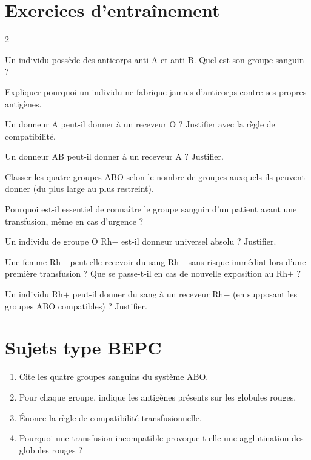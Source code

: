 \section{Exercices d'entraînement}
\begin{multicols}{2}

\exo{} Un individu possède des anticorps anti-A et anti-B. Quel est son groupe
sanguin ?

\exo{} Expliquer pourquoi un individu ne fabrique jamais d'anticorps contre ses
propres antigènes.

\exo{} Un donneur A peut-il donner à un receveur O ? Justifier avec la règle de
compatibilité.

\exo{} Un donneur AB peut-il donner à un receveur A ? Justifier.

\exo{} Classer les quatre groupes ABO selon le nombre de groupes auxquels ils
peuvent donner (du plus large au plus restreint).

\exo{} Pourquoi est-il essentiel de connaître le groupe sanguin d'un patient
avant une transfusion, même en cas d'urgence ?

\exo{} Un individu de groupe O Rh$-$ est-il donneur universel absolu ? Justifier.

\exo{} Une femme Rh$-$ peut-elle recevoir du sang Rh$+$ sans risque immédiat lors
d'une première transfusion ? Que se passe-t-il en cas de nouvelle exposition au Rh$+$ ?

\exo{} Un individu Rh$+$ peut-il donner du sang à un receveur Rh$-$ (en
supposant les groupes ABO compatibles) ? Justifier.

\end{multicols}

\section{Sujets type BEPC}

\begin{enumerate}[label=\arabic*)]
\item Cite les quatre groupes sanguins du système ABO.
\item Pour chaque groupe, indique les antigènes présents sur les globules rouges.
\item Énonce la règle de compatibilité transfusionnelle.
\item Pourquoi une transfusion incompatible provoque-t-elle une agglutination des
globules rouges ?
\end{enumerate}


